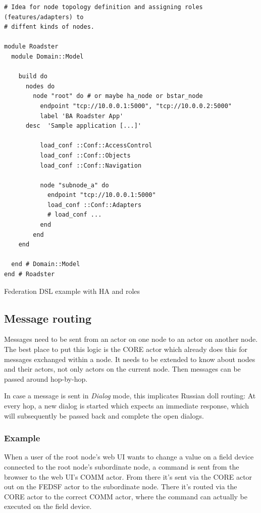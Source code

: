 \begin{listing}
	\begin{verbatim}
# Idea for node topology definition and assigning roles (features/adapters) to
# diffent kinds of nodes.

module Roadster
  module Domain::Model

    build do
      nodes do
        node "root" do # or maybe ha_node or bstar_node
          endpoint "tcp://10.0.0.1:5000", "tcp://10.0.0.2:5000"
          label 'BA Roadster App'
	  desc  'Sample application [...]'

          load_conf ::Conf::AccessControl
          load_conf ::Conf::Objects
          load_conf ::Conf::Navigation

          node "subnode_a" do
            endpoint "tcp://10.0.0.1:5000"
            load_conf ::Conf::Adapters
            # load_conf ...
          end
        end
    end

  end # Domain::Model
end # Roadster
	\end{verbatim}
	\caption{Federation DSL example with HA and roles}
	\label{lst:dsl:topo:with-roles}
\end{listing}


\subsection{Message routing}
Messages need to be sent from an actor on one node to an actor on another node.
The best place to put this logic is the CORE actor which already does this for
messages exchanged within a node. It needs to be extended to know about nodes
and their actors, not only actors on the current node. Then messages can be
passed around hop-by-hop.

In case a message is sent in \emph{Dialog} mode, this implicates Russian doll
routing: At every hop, a new dialog is started which expects an immediate
response, which will subsequently be passed back and complete the open dialogs.

\subsubsection{Example}
When a user of the root node's web UI wants to change a value on a field device
connected to the root node's subordinate node, a command is sent from the
browser to the web UI's COMM actor. From there it's sent via the CORE actor out
on the FEDSF actor to the subordinate node. There it's routed
via the CORE actor to the correct COMM actor, where the command can actually be
executed on the field device.

